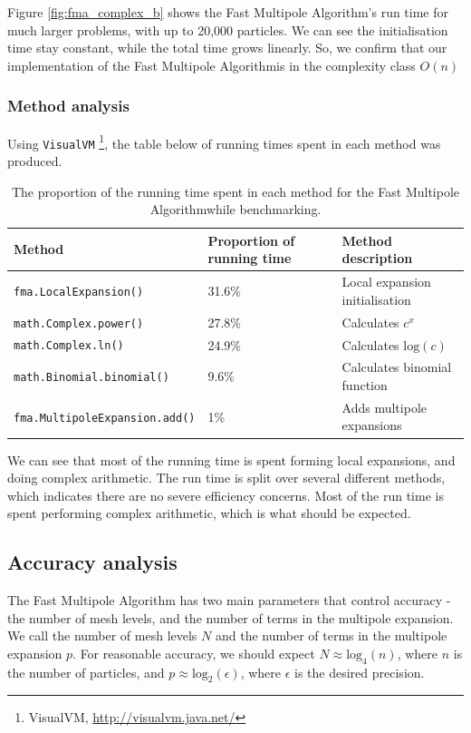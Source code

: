 \documentclass[pdftex,twoside,a4paper]{report}
\newcommand{\fma}{Fast Multipole Algorithm}
\begin{document}
Figure \ref{fig:fma_complex_b} shows the \fma's run time for much larger problems, with up to 20,000 particles. We can see the initialisation time stay constant, while the total time grows linearly. So, we confirm that our implementation of the \fma is in the complexity class $O(n)$ \newline
\subsubsection{Method analysis}
Using \texttt{VisualVM} \footnote{VisualVM, \url{http://visualvm.java.net/}}, the table below of running times spent in each method was produced.

\begin{table}
    \begin{tabular}{|l|l|l|}
        Method                       & Proportion of running time & Method description \\ \hline
        \texttt{fma.LocalExpansion()}         & 31.6\%                      & Local expansion initialisation        \\ 
        \texttt{math.Complex.power()}         & 27.8\%                      & Calculates $c^x$             \\ 
        \texttt{math.Complex.ln()}            & 24.9\%                      & Calculates $\text{log}(c)$ \\
        \texttt{math.Binomial.binomial()}     & 9.6\%                       & Calculates binomial function \\ 
        \texttt{fma.MultipoleExpansion.add()} & 1\%                         & Adds multipole expansions
    \end{tabular}
    \label{tab:time_breakdown}
    \caption{The proportion of the running time spent in each method for the \fma while benchmarking.}
\end{table}

We can see that most of the running time is spent forming local expansions, and doing complex arithmetic. The run time is split over several different methods, which indicates there are no severe efficiency concerns. Most of the run time is spent performing complex arithmetic, which is what should be expected.

\subsection{Accuracy analysis}
The \fma{} has two main parameters that control accuracy - the number of mesh levels, and the number of terms in the multipole expansion. We call the number of mesh levels $N$ and the number of terms in the multipole expansion $p$. For reasonable accuracy, we should expect $N \approx \text{log}_4(n)$, where $n$ is the number of particles, and $p \approx \text{log}_2(\epsilon)$, where $\epsilon$ is the desired precision. \cite{greengard:315}
\end{document}
